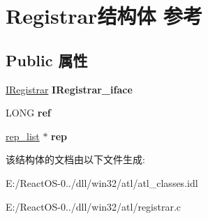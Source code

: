 \hypertarget{class_registrar}{}\section{Registrar结构体 参考}
\label{class_registrar}
\subsection*{Public 属性}
\begin{DoxyCompactItemize}
\item 
\mbox{\label{class_registrar_ae1e12aeca95582f55a6344fd42be08eb}} 
\hyperlink{interface_i_registrar}{I\+Registrar} {\bfseries I\+Registrar\+\_\+iface}
\item 
\mbox{\label{class_registrar_aeb9d7084e88f3e5e2330e55ae5345866}} 
L\+O\+NG {\bfseries ref}
\item 
\mbox{\label{class_registrar_a2f7f54f7119a09303215459b91b03ee4}} 
\hyperlink{structrep__list__str}{rep\+\_\+list} $\ast$ {\bfseries rep}
\end{DoxyCompactItemize}


该结构体的文档由以下文件生成\+:\begin{DoxyCompactItemize}
\item 
E\+:/\+React\+O\+S-\/0../dll/win32/atl/atl\+\_\+classes.\+idl\item 
E\+:/\+React\+O\+S-\/0../dll/win32/atl/registrar.\+c\end{DoxyCompactItemize}
